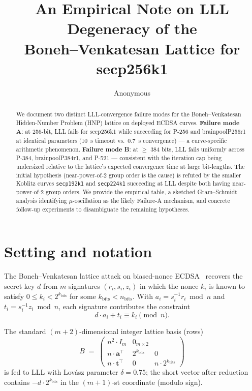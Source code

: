 \documentclass[10pt,a4paper]{article}
\title{An Empirical Note on LLL Degeneracy of the\\
       Boneh--Venkatesan Lattice for secp256k1}
\author{Anonymous}
\date{}
\begin{document}
\maketitle

\begin{abstract}
We document two distinct LLL-convergence failure modes for the
Boneh--Venkatesan Hidden-Number Problem (HNP) lattice on deployed
ECDSA curves. \textbf{Failure mode A}: at 256-bit, LLL fails for
secp256k1 while succeeding for P-256 and brainpoolP256r1 at
identical parameters (10~s timeout vs.\ 0.7~s convergence) — a
curve-specific arithmetic phenomenon. \textbf{Failure mode B}: at
$\geq$ 384 bits, LLL fails uniformly across P-384, brainpoolP384r1,
and P-521 — consistent with the iteration cap being undersized
relative to the lattice's expected convergence time at large
bit-lengths. The initial hypothesis (near-power-of-2 group order
is the cause) is refuted by the smaller Koblitz curves
\texttt{secp192k1} and \texttt{secp224k1} succeeding at LLL despite
both having near-power-of-2 group orders. We provide the empirical
table, a sketched Gram--Schmidt analysis identifying
$\mu$-oscillation as the likely Failure-A mechanism, and concrete
follow-up experiments to disambiguate the remaining hypotheses.
\end{abstract}

\section{Setting and notation}

The Boneh--Venkatesan lattice attack on biased-nonce
ECDSA~\cite{boneh1996,nguyen2002} recovers the secret key $d$ from
$m$ signatures $(r_i, s_i, z_i)$ in which the nonce $k_i$ is known
to satisfy $0 \leq k_i < 2^{k_{\text{bits}}}$ for some
$k_{\text{bits}} < n_{\text{bits}}$. With $a_i = s_i^{-1} r_i \bmod n$
and $t_i = s_i^{-1} z_i \bmod n$, each signature contributes the
constraint
\[
   d \cdot a_i + t_i \equiv k_i \pmod{n}.
\]

The standard $(m+2)$-dimensional integer lattice basis (rows)
\[
   B \;=\;
   \begin{pmatrix}
     n^2 \cdot I_m   & 0_{m \times 2}  \\[2pt]
     n \cdot \mathbf{a}^\top  & 2^{k_{\text{bits}}}  & 0 \\[2pt]
     n \cdot \mathbf{t}^\top  & 0  & n \cdot 2^{k_{\text{bits}}}
   \end{pmatrix}
\]
is fed to LLL with Lov\'asz parameter $\delta = 0.75$; the short
vector after reduction contains $-d \cdot 2^{k_{\text{bits}}}$ in
the $(m+1)$-st coordinate (modulo sign).
\end{document}

